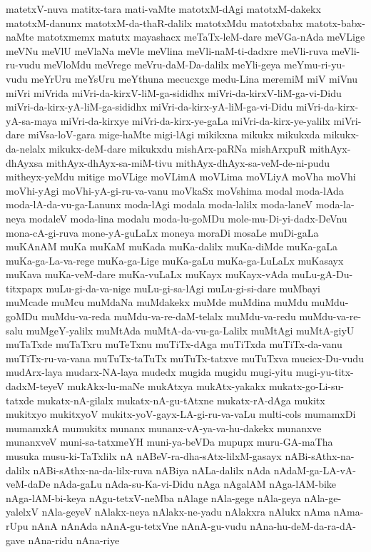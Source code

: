 {matetxV-nuva
matitx-tara
mati-vaMte
matotxM-dAgi
matotxM-dakekx
matotxM-danunx
matotxM-da-thaR-dalilx
matotxMdu
matotxbabx
matotx-babx-naMte
matotxmemx
matutx
mayashacx
meTaTx-leM-dare
meVGa-nAda
meVLige
meVNu
meVlU
meVlaNa
meVle
meVlina
meVli-naM-ti-dadxre
meVli-ruva
meVli-ru-vudu
meVloMdu
meVrege
meVru-daM-Da-dalilx
meYli-geya
meYmu-ri-yu-vudu
meYrUru
meYsUru
meYthuna
mecucxge
medu-Lina
meremiM
miV
miVnu
miVri
miVrida
miVri-da-kirxV-liM-ga-sididhx
miVri-da-kirxV-liM-ga-vi-Didu
miVri-da-kirx-yA-liM-ga-sididhx
miVri-da-kirx-yA-liM-ga-vi-Didu
miVri-da-kirx-yA-sa-maya
miVri-da-kirxye
miVri-da-kirx-ye-gaLa
miVri-da-kirx-ye-yalilx
miVri-dare
miVsa-loV-gara
mige-haMte
migi-lAgi
mikikxna
mikukx
mikukxda
mikukx-da-nelalx
mikukx-deM-dare
mikukxdu
mishArx-paRNa
mishArxpuR
mithAyx-dhAyxsa
mithAyx-dhAyx-sa-miM-tivu
mithAyx-dhAyx-sa-veM-de-ni-pudu
mitheyx-yeMdu
mitige
moVLige
moVLimA
moVLima
moVLiyA
moVha
moVhi
moVhi-yAgi
moVhi-yA-gi-ru-va-vanu
moVkaSx
moVshima
modal
moda-lAda
moda-lA-da-vu-ga-Lanunx
moda-lAgi
modala
moda-lalilx
moda-laneV
moda-la-neya
modaleV
moda-lina
modalu
moda-lu-goMDu
mole-mu-Di-yi-dadx-DeVnu
mona-cA-gi-ruva
mone-yA-guLaLx
moneya
moraDi
mosaLe
muDi-gaLa
muKAnAM
muKa
muKaM
muKada
muKa-dalilx
muKa-diMde
muKa-gaLa
muKa-ga-La-va-rege
muKa-ga-Lige
muKa-gaLu
muKa-ga-LuLaLx
muKasayx
muKava
muKa-veM-dare
muKa-vuLaLx
muKayx
muKayx-vAda
muLu-gA-Du-titxpapx
muLu-gi-da-va-nige
muLu-gi-sa-lAgi
muLu-gi-si-dare
muMbayi
muMcade
muMcu
muMdaNa
muMdakekx
muMde
muMdina
muMdu
muMdu-goMDu
muMdu-va-reda
muMdu-va-re-daM-telalx
muMdu-va-redu
muMdu-va-re-salu
muMgeY-yalilx
muMtAda
muMtA-da-vu-ga-Lalilx
muMtAgi
muMtA-giyU
muTaTxde
muTaTxru
muTeTxnu
muTiTx-dAga
muTiTxda
muTiTx-da-vanu
muTiTx-ru-va-vana
muTuTx-taTuTx
muTuTx-tatxve
muTuTxva
mucicx-Du-vudu
mudArx-laya
mudarx-NA-laya
mudedx
mugida
mugidu
mugi-yitu
mugi-yu-titx-dadxM-teyeV
mukAkx-lu-maNe
mukAtxya
mukAtx-yakakx
mukatx-go-Li-su-tatxde
mukatx-nA-gilalx
mukatx-nA-gu-tAtxne
mukatx-rA-dAga
mukitx
mukitxyo
mukitxyoV
mukitx-yoV-gayx-LA-gi-ru-va-vaLu
multi-cols
mumamxDi
mumamxkA
mumukitx
munanx
munanx-vA-ya-va-hu-dakekx
munanxve
munanxveV
muni-sa-tatxmeYH
muni-ya-beVDa
mupupx
muru-GA-maTha
musuka
musu-ki-TaTxlilx
nA
nABeV-ra-dha-sAtx-lilxM-gasayx
nABi-sAthx-na-dalilx
nABi-sAthx-na-da-lilx-ruva
nABiya
nALa-dalilx
nAda
nAdaM-ga-LA-vA-veM-daDe
nAda-gaLu
nAda-su-Ka-vi-Didu
nAga
nAgalAM
nAga-lAM-bike
nAga-lAM-bi-keya
nAgu-tetxV-neMba
nAlage
nAla-gege
nAla-geya
nAla-ge-yalelxV
nAla-geyeV
nAlakx-neya
nAlakx-ne-yadu
nAlakxra
nAlukx
nAma
nAma-rUpu
nAnA
nAnAda
nAnA-gu-tetxVne
nAnA-gu-vudu
nAna-hu-deM-da-ra-dA-gave
nAna-ridu
nAna-riye
}

